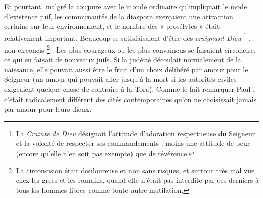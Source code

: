 Et pourtant, malgré la coupure avec le monde ordinaire qu'impliquait le mode d'existence juif, les communautés de la diaspora exerçaient une attraction certaine sur leur environnement, et le nombre des « prosélytes » était relativement important. Beaucoup se satisfaisaient d'être des \emph{craignant Dieu}%
\footnote{La \emph{Crainte de Dieu} désignait l'attitude d'adoration respectueuse du Seigneur et la volonté de respecter ses commandements : moins une attitude de peur (encore qu'elle n'en soit pas exempte) que de révérence.}%
, non circoncis%
\footnote{La circoncision était douloureuse et non sans risques, et surtout très mal vue chez les grecs et les romains, quand elle n'était pas interdite par ces derniers à tous les hommes libres comme toute autre mutilation.}%
. Les plus courageux ou les plus convaincus se faisaient circoncire, ce qui en faisait de nouveaux juifs. Si la judéité découlait normalement de la naissance, elle pouvait aussi être le fruit d'un choix délibéré par amour pour le Seigneur (un amour qui pouvait aller jusqu'à la mort si les autorités civiles exigeaient quelque chose de contraire à la Tora). Comme le fait remarquer Paul , c'était radicalement différent des cités contemporaines qu'on ne choisissait jamais par amour pour leurs dieux.

